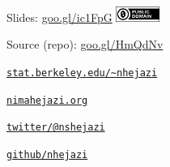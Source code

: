 \documentclass[12pt,t]{beamer}
\begin{document}
\begin{frame}[c]{}

\Large
Slides: \href{https://goo.gl/ic1FpG}{goo.gl/ic1FpG} \quad
\includegraphics[height=5mm]{Figs/cc-zero.png}

\vspace{5mm}

Source (repo): \href{https://goo.gl/HmQdNv}{goo.gl/HmQdNv}

\vspace{5mm}

\href{https://www.stat.berkeley.edu/~nhejazi}{\tt stat.berkeley.edu/\textasciitilde{}nhejazi}

\vspace{5mm}

\href{http://nimahejazi.org}{\tt nimahejazi.org}

\vspace{5mm}

\href{https://twitter.com/nshejazi}{\tt twitter/@nshejazi}

\vspace{5mm}

\href{https://github.com/nhejazi}{\tt github/nhejazi}


\end{frame}
\end{document}
